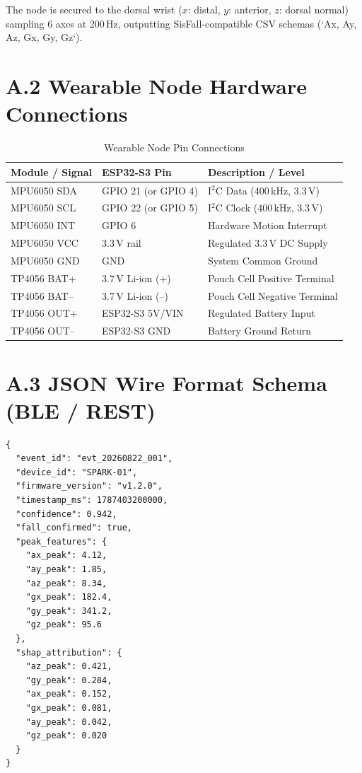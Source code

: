The node is secured to the dorsal wrist ($x$: distal, $y$: anterior, $z$: dorsal normal) sampling 6 axes at 200\,Hz, outputting SisFall-compatible CSV schemas (`Ax, Ay, Az, Gx, Gy, Gz`).

\section*{A.2 \quad Wearable Node Hardware Connections}

\begin{table}[H]
    \centering
    \caption*{Wearable Node Pin Connections}
    \begin{tabular}{|l|l|l|}
        \hline
        \textbf{Module / Signal} & \textbf{ESP32-S3 Pin} & \textbf{Description / Level} \\
        \hline
        MPU6050 SDA & GPIO 21 (or GPIO 4) & I$^2$C Data (400\,kHz, 3.3\,V) \\
        MPU6050 SCL & GPIO 22 (or GPIO 5) & I$^2$C Clock (400\,kHz, 3.3\,V) \\
        MPU6050 INT & GPIO 6 & Hardware Motion Interrupt \\
        MPU6050 VCC & 3.3\,V rail & Regulated 3.3\,V DC Supply \\
        MPU6050 GND & GND & System Common Ground \\
        TP4056 BAT+ & 3.7\,V Li-ion (+) & Pouch Cell Positive Terminal \\
        TP4056 BAT-- & 3.7\,V Li-ion (--) & Pouch Cell Negative Terminal \\
        TP4056 OUT+ & ESP32-S3 5V/VIN & Regulated Battery Input \\
        TP4056 OUT-- & ESP32-S3 GND & Battery Ground Return \\
        \hline
    \end{tabular}
\end{table}

\section*{A.3 \quad JSON Wire Format Schema (BLE / REST)}

\begin{verbatim}
{
  "event_id": "evt_20260822_001",
  "device_id": "SPARK-01",
  "firmware_version": "v1.2.0",
  "timestamp_ms": 1787403200000,
  "confidence": 0.942,
  "fall_confirmed": true,
  "peak_features": {
    "ax_peak": 4.12,
    "ay_peak": 1.85,
    "az_peak": 8.34,
    "gx_peak": 182.4,
    "gy_peak": 341.2,
    "gz_peak": 95.6
  },
  "shap_attribution": {
    "az_peak": 0.421,
    "gy_peak": 0.284,
    "ax_peak": 0.152,
    "gx_peak": 0.081,
    "ay_peak": 0.042,
    "gz_peak": 0.020
  }
}
\end{verbatim}
